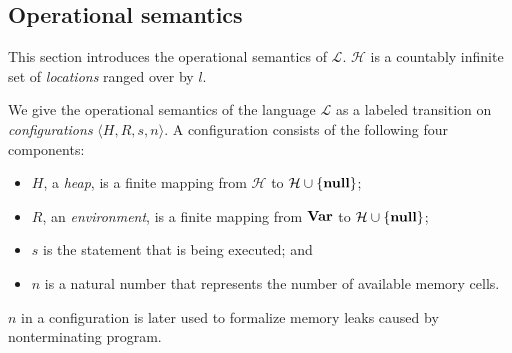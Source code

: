 
\subsection{Operational semantics}
\label{sec:languageSemantics}

This section introduces the operational semantics of \(\mathcal{L}\).
\(\mathcal{H}\) is a countably infinite set of \emph{locations} ranged
over by \(l\).

We give the operational semantics of the language \(\mathcal{L}\) as a
labeled transition on \emph{configurations} \(\langle H, R, s, n
\rangle\).  A configuration consists of the following four components:
\begin{itemize}
\item \(H\), a \emph{heap}, is a finite mapping from \(\mathcal{H}\)
  to \(\mathcal{H} \cup \{\mathbf{null}\}\);
\item \(R\), an \emph{environment}, is a finite mapping from \(\mathbf{Var}\)
  to \(\mathcal{H} \cup \{\mathbf{null}\}\);
\item \(s\) is the statement that is being executed; and
\item \(n\) is a natural number that represents the number of
  available memory cells.
\end{itemize}
\(n\) in a configuration is later used to formalize memory leaks
caused by nonterminating program.

